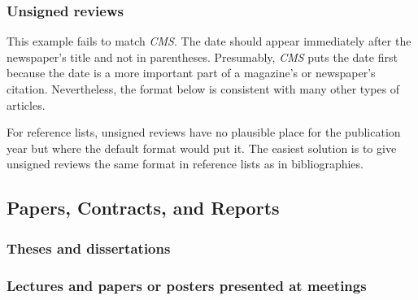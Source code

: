 \documentclass[11pt,letterpaper,oneside]{article}
\begin{document}
\setcounter{subsubsection}{203}
\subsubsection{Unsigned reviews}

This example fails to match \textit{CMS}. The date should appear
immediately after the newspaper's title and not in parentheses.
Presumably, \textit{CMS} puts the date first because the date is a
more important part of a magazine's or newspaper's citation.
Nevertheless, the format below is consistent with many other types of
articles.

For reference lists, unsigned reviews have no plausible place for the
publication year but where the default format would put it. The
easiest solution is to give unsigned reviews the same format in
reference lists as in bibliographies.

\begin{citebib}
\item \cite{zeitung1828}
\end{citebib}

\setcounter{subsection}{6}
\subsection{Papers, Contracts, and Reports}
\setcounter{subsection}{14}

\setcounter{subsubsection}{214}
\subsubsection{Theses and dissertations}

\begin{citebib}
\item \cite[59]{vedrashko2006}
\item \cite{choi2008}
\end{citebib}

\setcounter{subsubsection}{216}
\subsubsection{Lectures and papers or posters presented at meetings}

\begin{citebib}
\item \cite{hong2015}
\end{citebib}
\end{document}
